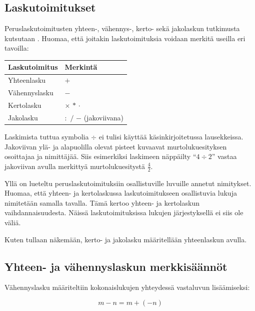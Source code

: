 \subsection*{Laskutoimitukset}
Peruslaskutoimitusten yhteen-, vähennys-, kerto- sekä jakolaskun tutkimusta kutsutaan . Huomaa, että joitakin laskutoimituksia voidaan merkitä useilla eri tavoilla:

\begin{center}\begin{tabular}{l|l}
Laskutoimitus & Merkintä\\
\hline
Yhteenlasku & $+$ \\
Vähennyslasku & $-$ \\
Kertolasku & $ \times $  $ \ast $  $ \cdot $ \\
Jakolasku & $:$ $/$ $-$ (jakoviivana) \\
\end{tabular} \end{center} 

Laskimista tuttua symbolia $\div$ ei tulisi käyttää käsinkirjoitetussa lausekkeissa. Jakoviivan ylä- ja alapuolilla olevat pisteet kuvaavat murtolukuesityksen osoittajaa ja nimittäjää. Siis esimerkiksi laskimeen näppäilty ``$4\div2$'' vastaa jakoviivan avulla merkittyä murtolukuesitystä $\frac{4}{2}$.


Yllä on lueteltu peruslaskutoimituksiin osallistuville luvuille annetut nimitykset. Huomaa, että yhteen- ja kertolaskussa laskutoimitukseen osallistuvia lukuja nimitetään samalla tavalla. Tämä kertoo yhteen- ja kertolaskun vaihdannaisuudesta. Näissä laskutoimituksissa lukujen järjestyksellä ei siis ole väliä.

Kuten tullaan näkemään, kerto- ja jakolasku määritellään yhteenlaskun avulla.

\subsection*{Yhteen- ja vähennyslaskun merkkisäännöt}

Vähennyslasku määriteltiin kokonaislukujen yhteydessä vastaluvun lisäämiseksi:

\[m-n = m+(-n)\]

